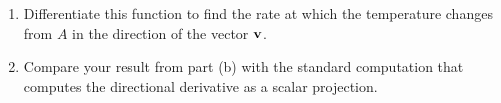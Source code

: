 \documentclass{ximera}
\begin{document}
\begin{exploration}
\begin{enumerate}
\item Differentiate this function to find the rate at which the temperature changes from $A$ in the direction of the vector ${\bf v}$.

\item Compare your result from part (b) with the standard computation that computes the directional derivative as a scalar projection.

\end{enumerate}




\end{exploration}
\end{document}
